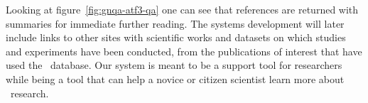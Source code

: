 

Looking at figure~\ref{fig:gnqa-atf3-qa} one can see that references are returned with summaries for immediate further reading.
The systems development will later include links to other sites with scientific works and datasets on which studies and experiments have been conducted, from the publications of interest that have used the \GN\ database.
Our system is meant to be a support tool for researchers while being a tool that can help a novice or citizen scientist learn more about \GN\ research.

